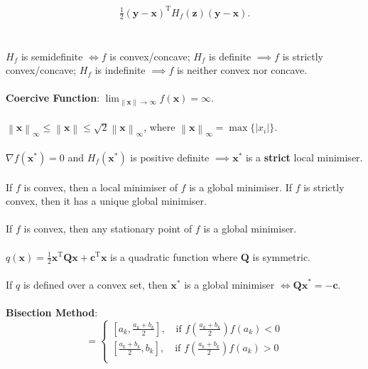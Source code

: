 \documentclass[12pt]{article}
\begin{document}
\begin{multicols*}{3}
\begin{multline*}
            \frac{1}{2}(\bm{y - x})^{\mathrm{T}}H_f(\bm{z})(\bm{y - x}).
        \end{multline*}
        \\\\
        $H_f$ is semidefinite $\iff f$ is convex/concave; $H_f$ is definite $\implies f$ is strictly convex/concave; $H_f$ is indefinite $\implies f$ is neither convex nor concave.
        \\\\
        \textbf{Coercive Function}: $\lim_{\left\lVert\bm{x}\right\rVert \to \infty}f(\bm{x}) = \infty$.
        \\\\
        $\left\lVert\bm{x}\right\rVert_\infty \leq \left\lVert\bm{x}\right\rVert \leq \sqrt{2}\left\lVert\bm{x}\right\rVert_\infty$, where $\left\lVert\bm{x}\right\rVert_\infty = \max\{\left\lvert x_i \right\rvert\}$.
        \\\\
        $\nabla f(\bm{x}^*) = 0$ and $H_f(\bm{x}^*)$ is positive definite $\implies \bm{x}^*$ is a \textbf{strict} local minimiser.
        \\\\
        If $f$ is convex, then a local minimiser of $f$ is a global minimiser. If $f$ is strictly convex, then it has a unique global minimiser.
        \\\\
        If $f$ is convex, then any stationary point of $f$ is a global minimiser.
        \\\\
        $q(\bm{x}) = \frac{1}{2}\bm{x}^{\mathrm{T}}\bm{Qx} + \bm{c}^{\mathrm{T}}\bm{x}$ is a quadratic function where $\bm{Q}$ is symmetric.
        \\\\
        If $q$ is defined over a convex set, then $\bm{x}^*$ is a global minimiser $\iff \bm{Qx}^* = -\bm{c}$.
        \\\\
        \textbf{Bisection Method}: 
        \begin{equation*}
            [a_{k + 1}, b_{k + 1}] = \begin{cases}
                \left[a_k, 
                \frac{a_k + b_k}{2}\right], \quad \textrm{if } f\left(\frac{a_k + b_k}{2}\right)f(a_k) < 0 \\
                \left[\frac{a_k + b_k}{2}, b_k\right], \quad \textrm{if } f\left(\frac{a_k + b_k}{2}\right)f(a_k) > 0 \\

\end{cases}
\end{equation*}
\end{multicols*}
\end{document}
